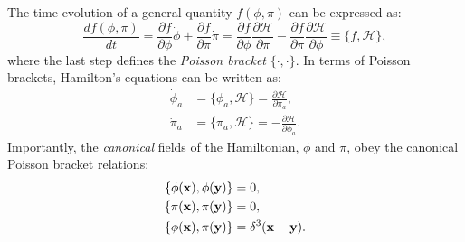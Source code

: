 The time evolution of a general quantity $f(\phi, \pi)$ can be expressed as:
\begin{equation}
	\label{eq:01_qft_hamiltonian_time_evolution_f}
	\frac{df(\phi, \pi)}{dt} = \frac{\partial f}{\partial\phi}\dot\phi + \frac{\partial f}{\partial\pi}\dot\pi = \frac{\partial f}{\partial\phi}\frac{\partial\mathcal H}{\partial\pi} - \frac{\partial f}{\partial\pi}\frac{\partial\mathcal H}{\partial\phi} \equiv \{f, \mathcal H\},
\end{equation}
where the last step defines the \textit{Poisson bracket} $\{\cdot, \cdot\}$.
In terms of Poisson brackets, Hamilton's equations can be written as:
\begin{equation}
	\label{eq:01_qft_hamiltonian_eoms_poisson}
	\begin{split}
		\dot\phi_a &= \{\phi_a, \mathcal H\} = \frac{\partial\mathcal H}{\partial\pi_a}, \\
		\dot\pi_a &= \{\pi_a, \mathcal H\} = -\frac{\partial\mathcal H}{\partial\phi_a}.
	\end{split}
\end{equation}
Importantly, the \textit{canonical} fields of the Hamiltonian, $\phi$ and $\pi$, obey the canonical Poisson bracket relations:
\begin{equation}
	\label{eq:01_qft_hamiltonian_canonical_poisson}
	\begin{split}
		\{\phi(\mathbf{x}), \phi(\mathbf{y})\} &= 0, \\
		\{\pi(\mathbf{x}), \pi(\mathbf{y})\} &= 0, \\
		\{\phi(\mathbf{x}), \pi(\mathbf{y})\} &= \delta^3(\mathbf{x} - \mathbf{y}).
	\end{split}
\end{equation}

